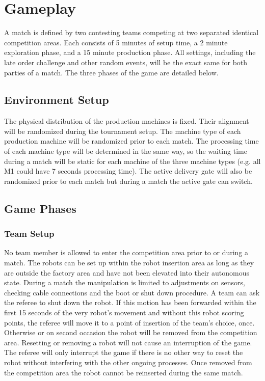 \documentclass[12pt,twoside]{article}
\begin{document}
\section{Gameplay}
A match is defined by two contesting teams competing at two separated
identical competition areas. Each consists of 5 minutes of setup time,
a 2 minute exploration phase, and a 15 minute production phase. All
settings, including the late order challenge and other random events,
will be the exact same for both parties of a match. The three phases
of the game are detailed below.

\subsection{Environment Setup}
\label{sec:}

The physical distribution of the production machines is fixed. Their
alignment will be randomized during the tournament setup. The machine type of each production
machine will be randomized prior to each match. The processing time of
each machine type will be determined in the same way, so the waiting
time during a match will be static for each machine of the three
machine types (e.g. all M1 could have 7 seconds processing time). The
active delivery gate will also be randomized prior to each match but
during a match the active gate can switch.

\subsection{Game Phases}
\label{sec:game-phases}

\subsubsection{Team Setup}
\label{sec:team-setup}
No team member is allowed to enter the competition area prior to or
during a match. The robots can be set up within the robot insertion
area as long as they are outside the factory area and have not been
elevated into their autonomous state. During a match the manipulation
is limited to adjustments on sensors, checking cable connections and
the boot or shut down procedure. A team can ask the referee to shut
down the robot. If this motion has been forwarded within the first 15
seconds of the very robot's movement and without this robot scoring
points, the referee will move it to a point of insertion of the team's
choice, once. Otherwise or on second occasion the robot will be
removed from the competition area. Resetting or removing a robot will
not cause an interruption of the game. The referee will only interrupt
the game if there is no other way to reset the robot without
interfering with the other ongoing processes. Once removed from the
competition area the robot cannot be reinserted during the same match.
\end{document}

